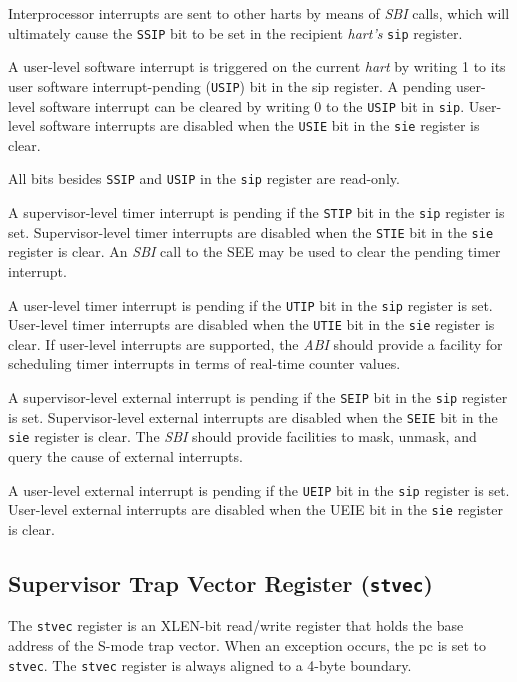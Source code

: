 Interprocessor interrupts are sent to other harts by means of \emph{SBI}
calls, which will ultimately cause the \texttt{SSIP} bit to be set in the
recipient \emph{hart's} \texttt{sip} register.

A user-level software interrupt is triggered on the current \emph{hart}
by writing 1 to its user software interrupt-pending (\texttt{USIP}) bit in the
sip register. A pending user-level software interrupt can be cleared by
writing 0 to the \texttt{USIP} bit in \texttt{sip}. User-level software interrupts are
disabled when the \texttt{USIE} bit in the \texttt{sie} register is clear.

All bits besides \texttt{SSIP} and \texttt{USIP} in the \texttt{sip} register are read-only.

A supervisor-level timer interrupt is pending if the \texttt{STIP} bit in the \texttt{sip}
register is set. Supervisor-level timer interrupts are disabled when the
\texttt{STIE} bit in the \texttt{sie} register is clear. An \emph{SBI} call to the SEE may
be used to clear the pending timer interrupt.

A user-level timer interrupt is pending if the \texttt{UTIP} bit in the \texttt{sip}
register is set. User-level timer interrupts are disabled when the \texttt{UTIE}
bit in the \texttt{sie} register is clear. If user-level interrupts are
supported, the \emph{ABI} should provide a facility for scheduling timer
interrupts in terms of real-time counter values.

A supervisor-level external interrupt is pending if the \texttt{SEIP} bit in the
\texttt{sip} register is set. Supervisor-level external interrupts are disabled
when the \texttt{SEIE} bit in the \texttt{sie} register is clear. The \emph{SBI} should
provide facilities to mask, unmask, and query the cause of external
interrupts.

A user-level external interrupt is pending if the \texttt{UEIP} bit in the \texttt{sip}
register is set. User-level external interrupts are disabled when the
UEIE bit in the \texttt{sie} register is clear.

\subsection{Supervisor Trap Vector Register
(\texttt{stvec})}\label{supervisor-trap-vector-register-stvec}

The \texttt{stvec} register is an XLEN-bit read/write register that holds the
base address of the S-mode trap vector. When an exception occurs, the pc
is set to \texttt{stvec}. The \texttt{stvec} register is always aligned to a 4-byte
boundary.



